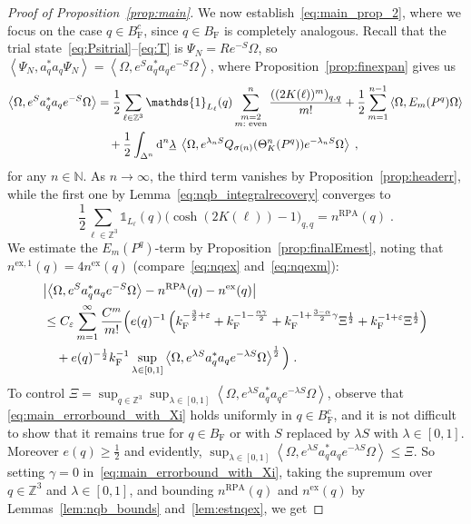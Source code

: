 \documentclass[12pt,a4paper]{article}
\numberwithin{equation}{section}
\newcommand{\1}{\mathbb{I}}
\newcommand{\di}{\textnormal{d}}
\newcommand{\ex}{\mathrm{ex}}
\newcommand{\F}{\mathrm{F}}
\newcommand{\RPA}{\mathrm{RPA}}
\newcommand{\Zstar}{\mathbb{Z}^3} %
\newcommand{\N}{\mathbb{N}}
\newcommand{\Z}{\mathbb{Z}}
\newcommand{\half}{\frac{1}{2}}
\newcommand{\eva}[1]{\left\langle #1 \right\rangle}
\theoremstyle{plain}
\theoremstyle{definition}
\theoremstyle{remark}
\theoremstyle{plain}
\theoremstyle{definition}
\theoremstyle{remark}
\begin{document}
\begin{proof}[Proof of Proposition~\ref{prop:main}]
We now establish~\eqref{eq:main_prop_2}, where we focus on the case $ q \in B_{\F}^c $, since $ q \in B_{\F} $ is completely analogous. Recall that the trial state~\eqref{eq:Psitrial}--\eqref{eq:T} is $ \Psi_N = R e^{-S} \Omega $, so $ \eva{\Psi_N, a_q^* a_q \Psi_N} = \eva{\Omega, e^{S} a_q^* a_q e^{-S} \Omega} $, where Proposition~\ref{prop:finexpan} gives us
\begin{align*}
	\eva{\Omega, e^{S} a_q^* a_q e^{-S} \Omega} 
	&= \half\sum_{\ell\in \Zstar}\mathds{1}_{L_\ell}(q) \sum_{\substack{m=2\\m:\textnormal{ even}}}^n \frac{((2K(\ell))^m)_{q,q}}{m!}
		+ \half \sum_{m=1}^{n-1} \eva{\Omega, E_m(P^q)\Omega}\nonumber\\
	&\quad +\half \int_{\Delta^n} \di^n\underline{\lambda} \;
		\eva{\Omega, e^{\lambda_n S}Q_{\sigma(n)}(\Theta^n_{K}(P^q)) e^{-\lambda_n S} \Omega} \;,
\end{align*}
for any $ n \in \N $. As $ n \to \infty $, the third term vanishes by Proposition~\ref{prop:headerr}, while the first one by Lemma~\ref{eq:nqb_integralrecovery} converges to
\begin{equation*}
	\half\sum_{\ell\in \Zstar}\mathds{1}_{L_\ell}(q) \big( \cosh(2K(\ell)) - 1 \big)_{q,q}
	= n^{\RPA}(q) \;.
\end{equation*}
We estimate the $ E_m(P^q) $-term by Proposition~\ref{prop:finalEmest}, noting that $ n^{\ex,1}(q) = 4 n^{\ex}(q) $ (compare~\eqref{eq:nqex} and~\eqref{eq:nqexm}):
\begin{align} \label{eq:main_errorbound_with_Xi}
	& \abs{\eva{\Omega, e^{S} a_q^* a_q e^{-S} \Omega} - n^{\textnormal{RPA}}(q) - n^{\ex}(q)} \nonumber\\
	&\le C_\varepsilon \sum_{m=1}^\infty \frac{C^m}{m!}
		\Big( e(q)^{-1}\left( k_{\F}^{-\frac 32 + \varepsilon} 
		+ k_{\F}^{-1 - \frac{\alpha \gamma}{2}} 
		+ k_{\F}^{-1 + \frac{3-\alpha}{2} \gamma} \Xi^\half
		+ k_{\F}^{-1+\varepsilon} \Xi^\half \right) \nonumber\\
	&\quad + e(q)^{-\half} k_{\F}^{-1} \sup_{\lambda \in [0,1]} \eva{\Omega, e^{\lambda S} a_q^* a_q e^{-\lambda S} \Omega}^{\half} \Big) \;.
\end{align}
To control $ \Xi = \sup_{q \in \Z^3} \sup_{\lambda \in [0,1]} \eva{\Omega, e^{\lambda S} a_q^* a_q e^{- \lambda S} \Omega} $, observe that \eqref{eq:main_errorbound_with_Xi} holds uniformly in $ q \in B_{\F}^c $, and it is not difficult to show that it remains true for $ q \in B_{\F} $ or with $ S $ replaced by $ \lambda S $ with $ \lambda \in [0,1] $. Moreover $ e(q) \ge \half $ and evidently, $ \sup_{\lambda \in [0,1]} \eva{\Omega, e^{\lambda S} a_q^* a_q e^{-\lambda S} \Omega} \le \Xi $. So setting $ \gamma = 0 $ in~\eqref{eq:main_errorbound_with_Xi}, taking the supremum over $ q \in \Z^3 $ and $ \lambda \in [0,1] $, and bounding $ n^{\RPA}(q) $ and $ n^{\ex}(q) $ by Lemmas~\ref{lem:nqb_bounds} and~\ref{lem:estnqex}, we get

\end{proof}
\end{document}
